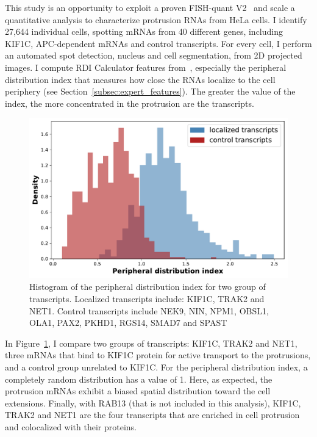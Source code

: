 This study is an opportunity to exploit a proven FISH-quant V2~\cite{Imbert_fq_2022} and scale a quantitative analysis to characterize protrusion \ac{RNA}s from HeLa cells.
I identify 27,644 individual cells, spotting \ac{mRNA}s from 40 different genes, including KIF1C, APC-dependent \ac{mRNA}s and control transcripts.
For every cell, I perform an automated spot detection, nucleus and cell segmentation, from 2D projected images.
I compute RDI Calculator features from~\cite{stueland_rdi_2019}, especially the peripheral distribution index that measures how close the \ac{RNA}s localize to the cell periphery (see Section~\ref{subsec:expert_features}).
The greater the value of the index, the more concentrated in the protrusion are the transcripts.

\begin{figure}[]
    \centering
    \includegraphics[width=\textwidth]{figures/chapter5/helacentrin_distribution_pdi}
    \caption[Histogram of the peripheral distribution index]{Histogram of the peripheral distribution index for two group of transcripts.
	Localized transcripts include: KIF1C, TRAK2 and NET1.
	Control transcripts include NEK9, NIN, NPM1, OBSL1, OLA1, PAX2, PKHD1, RGS14, SMAD7 and SPAST}
    \label{fig:xavier_pdi}
\end{figure}

In Figure~\ref{fig:xavier_pdi}, I compare two groups of transcripts: KIF1C, TRAK2 and NET1, three \ac{mRNA}s that bind to KIF1C protein for active transport to the protrusions, and a control group unrelated to KIF1C.
For the peripheral distribution index, a completely random distribution has a value of 1.
Here, as expected, the protrusion \ac{mRNA}s exhibit a biased spatial distribution toward the cell extensions.
Finally, with RAB13 (that is not included in this analysis), KIF1C, TRAK2 and NET1 are the four transcripts that are enriched in cell protrusion and colocalized with their proteins.

